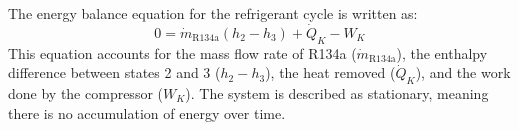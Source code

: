 The energy balance equation for the refrigerant cycle is written as:  
\[
0 = \dot{m}_{\text{R134a}} \left( h_2 - h_3 \right) + \dot{Q}_K - W_K
\]  
This equation accounts for the mass flow rate of R134a (\(\dot{m}_{\text{R134a}}\)), the enthalpy difference between states 2 and 3 (\(h_2 - h_3\)), the heat removed (\(\dot{Q}_K\)), and the work done by the compressor (\(W_K\)). The system is described as stationary, meaning there is no accumulation of energy over time.
